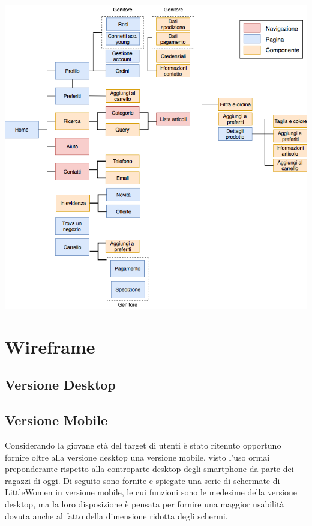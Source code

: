 \documentclass[12pt,a4paper]{report}
\begin{document}
\includegraphics[width=1\textwidth]{"Project Management Sources/Wireframe/Blueprint"}
\chapter{Wireframe}
\section{Versione Desktop}
\section{Versione Mobile}
Considerando la giovane età del target di utenti è stato ritenuto opportuno fornire oltre alla versione desktop una versione mobile, visto l'uso ormai preponderante rispetto alla controparte desktop degli smartphone da parte dei ragazzi di oggi. Di seguito sono fornite e spiegate una serie di schermate di LittleWomen in versione mobile, le cui funzioni sono le medesime della versione desktop, ma la loro disposizione è pensata per fornire una maggior usabilità dovuta anche al fatto della dimensione ridotta degli schermi.
\newpage
\end{document}
